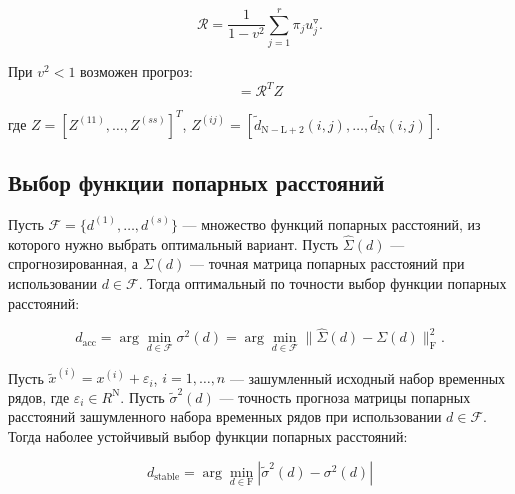 \documentclass{article}
\begin{document}
\begin{equation}
    \mathcal{R} = \dfrac{1}{1 - v^2} \sum\limits_{j = 1}^r\pi_ju_j^{\triangledown}.
\end{equation}

При $v^2 < 1$ возможен прогроз:
\begin{equation}
    [d_{\text{N} + 1}(1, 1), d_{\text{N} + 1}(1, 2), \ldots, d_{\text{N} + 1}(s, s)] = \mathcal{R}^TZ
\end{equation}

где $Z = [Z^{(11)}, \ldots, Z^{(ss)}]^T$, $Z^{(ij)} = [\widetilde{d}_{\text{N} - \text{L} + 2}(i, j), \ldots, \widetilde{d}_{\text{N}}(i, j)]$.

\subsection{Выбор функции попарных расстояний}

Пусть $\mathcal{F} = \{d^{(1)}, \ldots, d^{(s)}\}$ --- множество функций попарных расстояний, из которого нужно выбрать оптимальный вариант. Пусть $\hat{\Sigma}(d)$ --- спрогнозированная, а $\Sigma(d)$ --- точная матрица попарных расстояний при использовании $d \in \mathcal{F}$. Тогда оптимальный по точности выбор функции попарных расстояний:

\begin{equation}
    d_{\text{acc}} = \arg\min\limits_{d \in \mathcal{F}} \sigma^2(d) = \arg\min\limits_{d \in \mathcal{F}} \|\hat{\Sigma}(d) - \Sigma(d)\|_{\text{F}}^2.
\end{equation}

Пусть $\widetilde{x}^{(i)} = x^{(i)} + \varepsilon_i$, $i = 1, \ldots, n$ --- зашумленный исходный набор временных рядов, где $\varepsilon_i \in R^\text{N}$. Пусть $\widetilde{\sigma}^2(d)$ --- точность прогноза матрицы попарных расстояний зашумленного набора временных рядов при использовании $d \in \mathcal{F}$. Тогда наболее устойчивый выбор функции попарных расстояний:

\begin{equation}
    d_{\text{stable}} = \arg\min\limits_{d \in \text{F}}|\widetilde{\sigma}^2(d) - \sigma^2(d)|
\end{equation}



\end{document}
